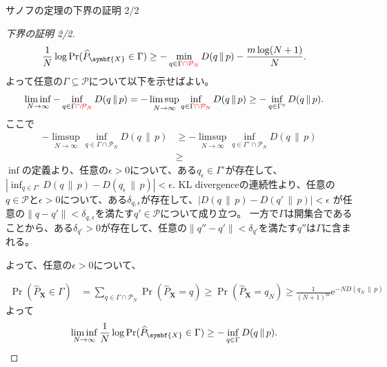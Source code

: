 \documentclass[lualatex,handout]{beamer}
\newcommand{\mycolor}[2]{%
  \begingroup
  \colorlet{currentcolor}{.}%
  \color{#1}#2%
  \color{currentcolor}%
  \endgroup
}
\newcommand{\emm}[1]{\mycolor{red}{#1}}
\newcommand\KL[2]{D(#1\,\|\,#2)}
\theoremstyle{definition}
\begin{document}
\begin{frame}{サノフの定理の下界の証明 2/2}
\footnotesize
\sanov
\begin{proof}[\small 下界の証明 2/2]
\vspace{-1.5em}
\begin{align*}
\frac1N\log\Pr(\widehat{P}_{\symbf{X}}\in\Gamma) &\ge -\min_{q\in\Gamma\emm{\cap\mathcal{P}_N}}\KL{q}{p} - \frac{m\log(N+1)}{N}.
\end{align*}
よって任意の$\Gamma\subseteq\mathcal{P}$について以下を示せばよい。
\begin{align*}
 \liminf_{N\to\infty} -\inf_{q\in\Gamma\emm{\cap\mathcal{P}_N}}\KL{q}{p} &=
 -\limsup_{N\to\infty} \inf_{q\in\Gamma\emm{\cap\mathcal{P}_N}}\KL{q}{p} \ge -\inf_{q\in\Gamma^\circ}\KL{q}{p}.
\end{align*}
ここで
\begin{align*}
 -\limsup_{N\to\infty} \inf_{q\in\Gamma\cap\mathcal{P}_N}\KL{q}{p} &\ge
 -\limsup_{N\to\infty} \inf_{q\in\Gamma^\circ\cap\mathcal{P}_N}\KL{q}{p}\\
 &\ge
\end{align*}
$\inf$の定義より、任意の$\epsilon>0$について、ある$q_{\epsilon}\in\Gamma^\circ$が存在して、$|\inf_{q\in\Gamma^\circ}\KL{q}{p}-\KL{q_\epsilon}{p}|<\epsilon$.
KL divergenceの連続性より、任意の$q\in\mathcal{P}$と$\epsilon>0$について、ある$\delta_{q,\epsilon}$が存在して、$|\KL{q}{p}-\KL{q'}{p}|<\epsilon$ が任意の$\|q-q'\|<\delta_{q,\epsilon}$を満たす$q'\in\mathcal{P}$について成り立つ。
一方で$\Gamma$は開集合であることから、ある$\delta_{q'}>0$が存在して、任意の$\|q''-q'\|<\delta_{q'}$を満たす$q''$は$\Gamma$に含まれる。

よって、任意の$\epsilon>0$について、


\begin{align*}
\Pr(\widehat{P}_{\symbf{X}}\in\Gamma) &= \sum_{q\in\Gamma\cap\mathcal{P}_N} \Pr(\widehat{P}_{\symbf{X}} = q)
 \ge \Pr(\widehat{P}_{\symbf{X}}=q_N)
 \ge \frac1{(N+1)^m}\mathrm{e}^{-N\KL{q_N}{p}}
\end{align*}
よって
\begin{align*}
\liminf_{N\to\infty}\frac1N
\log\Pr(\widehat{P}_{\symbf{X}}\in\Gamma) &\ge -\inf_{q\in\Gamma}\KL{q}{p}.\qedhere
\end{align*}
\end{proof}
\end{frame}
\end{document}
